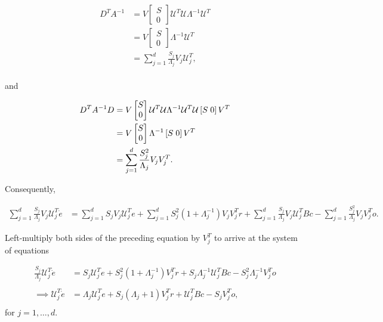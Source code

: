 \begin{enumerate}
\begin{align*}
     D^{T} A^{-1}  &= V \begin{bmatrix} S \\ 0\end{bmatrix} \mathcal{U}^T  \mathcal{U} \Lambda^{-1} \mathcal{U}^T \\
     &= V \begin{bmatrix} S \\ 0\end{bmatrix} \Lambda^{-1} \mathcal{U}^T \\
     &= \sum_{j = 1}^{d} \frac{S_j}{ \Lambda_j} V_j \mathcal{U}_j^T,
\end{align*}\\

and

\begin{align*}
D^{T} A^{-1} D  &= V \begin{bmatrix} S \\ 0\end{bmatrix} \mathcal{U}^T  \mathcal{U} \Lambda^{-1} \mathcal{U}^T \mathcal{U} \left[S \hspace{1mm} 0 \right] V^T \\
  &= V \begin{bmatrix} S \\ 0\end{bmatrix} \Lambda^{-1} \left[S \hspace{1mm} 0 \right] V^T \\
  &= \sum_{j = 1}^{d} \frac{S_j^2}{ \Lambda_j} V_j V_j^T.
\end{align*}

Consequently, 

\begin{align}
    \label{eq:derivation_sub_svd}
    \sum_{j = 1}^{d} \frac{S_j}{ \Lambda_j} V_j \mathcal{U}_j^T \dot{e} &= 
     \sum_{j=1}^d S_j V_j  \mathcal{U}_j^T e
    +
    \sum_{j = 1}^{d} S_j^2 (1 + \Lambda_j^{-1}) V_j V_j^T r
    + 
    \sum_{j = 1}^{d} \frac{S_j}{ \Lambda_j} V_j \mathcal{U}_j^TBc 
    -
    \sum_{j = 1}^{d} \frac{S_j^2}{ \Lambda_j} V_j V_j^T o.
\end{align}


Left-multiply both sides of the preceding equation by $V_j^T$ to arrive at the system of equations

\begin{align*}
    \frac{S_j}{\Lambda_j} \mathcal{U}_j^T \dot{e} &= 
    S_j \mathcal{U}_j^T e
    +
    S_j^2 (1 + \Lambda_j^{-1})V_j^T r 
    +
    S_j \Lambda_j^{-1} \mathcal{U}_j^T B c
    -
    S_j^2 \Lambda_j^{-1} V_j^T o
    \\
    \\
    \implies 
    \mathcal{U}_j^T \dot{e} 
    &= 
    \Lambda_j \mathcal{U}_j^T e
    +
    S_j(\Lambda_j + 1) V_j^T r 
    +
    \mathcal{U}_j^T B c
    -
    S_j V_j^T o,\\
\end{align*}
for $j = 1, \ldots, d$.


\end{enumerate}
